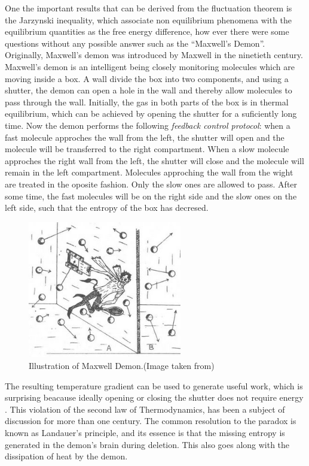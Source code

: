 One the important results that can be derived from the fluctuation theorem is the Jarzynski inequality\cite{PhysRevLett.78.2690}, which associate non equilibrium phenomena with the equilibrium quantities as the free energy difference, how ever there were some questions without any possible answer such as the ``Maxwell's Demon''.\\
Originally, Maxwell's demon was introduced by Maxwell in the ninetieth century. Maxwell's demon is an intelligent being closely monitoring molecules which are moving inside a box. A wall divide the box into two components, and using a shutter, the demon can open a hole in the wall and thereby allow molecules to pass through the wall. Initially, the gas in both parts of the box is in thermal equilibrium, which can be achieved by opening the shutter for a suficiently long time. Now the demon performs the following \textit{feedback control protocol}: when a fast molecule approches the wall from the left, the shutter will open and the molecule will be transferred to the right compartment. When a slow molecule approches the right wall from the left, the shutter will close and the molecule will remain in the left compartment. Molecules approching the wall from the wight are treated in the oposite fashion. Only the slow ones are allowed to pass. After some time, the fast molecules will be on the right side and the slow ones on the left side, such that the entropy of the box has decresed. 
\begin{figure}[h]
\centering
\includegraphics[width=0.6\textwidth]{Figures/MaxwellDemon1.jpg}
\caption{Illustration of Maxwell Demon.(Image taken from\cite{Gamow1940GAMMTI})}
\label{Maxwell}
\end{figure}
The resulting temperature gradient can be used to generate  useful work, which is surprising beacause ideally opening or closing the shutter does not require energy \cite{Gernot}. This violation of the second law of Thermodynamics, has been a subject of discussion for more than one century. The common resolution to the paradox is known as Landauer's principle\cite{5392446}, and its essence is that the missing entropy is generated in the demon's brain during deletion. This also goes along with the dissipation of heat by the demon.\\ 

